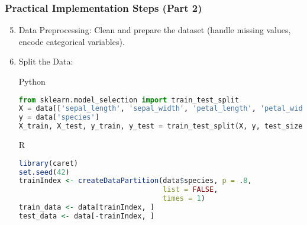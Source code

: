 \documentclass[aspectratio=169]{beamer}
\begin{document}
\begin{frame}[fragile]
    \frametitle{Practical Implementation Steps (Part 2)}
    \begin{enumerate}
        \setcounter{enumi}{4} %
        \item Data Preprocessing: Clean and prepare the dataset (handle missing values, encode categorical variables).
        \item Split the Data:
        \begin{block}{Python}
            \begin{lstlisting}[language=Python]
from sklearn.model_selection import train_test_split
X = data[['sepal_length', 'sepal_width', 'petal_length', 'petal_width']]
y = data['species']
X_train, X_test, y_train, y_test = train_test_split(X, y, test_size=0.2, random_state=42)
            \end{lstlisting}
        \end{block}
        \begin{block}{R}
            \begin{lstlisting}[language=R]
library(caret)
set.seed(42)
trainIndex <- createDataPartition(data$species, p = .8, 
                                  list = FALSE, 
                                  times = 1)
train_data <- data[trainIndex, ]
test_data <- data[-trainIndex, ]
            \end{lstlisting}
        \end{block}
    \end{enumerate}
\end{frame}
\end{document}

